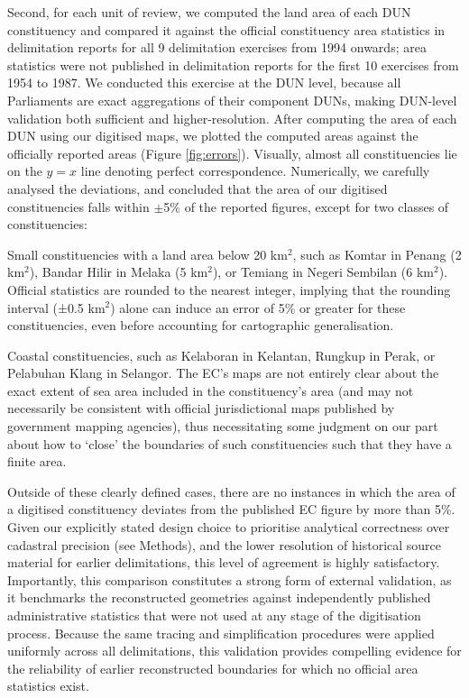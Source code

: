 \documentclass[11pt]{article}
\begin{document}
Second, for each unit of review, we computed the land area of each DUN constituency and compared it against the official constituency area statistics in delimitation reports for all 9 delimitation exercises from 1994 onwards; area statistics were not published in delimitation reports for the first 10 exercises from 1954 to 1987. We conducted this exercise at the DUN level, because all Parliaments are exact aggregations of their component DUNs, making DUN-level validation both sufficient and higher-resolution. After computing the area of each DUN using our digitised maps, we plotted the computed areas against the officially reported areas (Figure \ref{fig:errors}). Visually, almost all constituencies lie on the $y=x$ line denoting perfect correspondence. Numerically, we carefully analysed the deviations, and concluded that the area of our digitised constituencies falls within $\pm$5\% of the reported figures, except for two classes of constituencies:
\begin{enumbul}
	\item Small constituencies with a land area below 20 km$^2$, such as Komtar in Penang (2 km$^2$), Bandar Hilir in Melaka (5 km$^2$), or Temiang in Negeri Sembilan (6 km$^2$). Official statistics are rounded to the nearest integer, implying that the rounding interval (±0.5 km$^2$) alone can induce an error of 5\% or greater for these constituencies, even before accounting for cartographic generalisation.
	\item Coastal constituencies, such as Kelaboran in Kelantan, Rungkup in Perak, or Pelabuhan Klang in Selangor. The EC's maps are not entirely clear about the exact extent of sea area included in the constituency's area (and may not necessarily be consistent with official jurisdictional maps published by government mapping agencies), thus necessitating some judgment on our part about how to `close' the boundaries of such constituencies such that they have a finite area.
\end{enumbul}
Outside of these clearly defined cases, there are no instances in which the area of a digitised constituency deviates from the published EC figure by more than 5\%. Given our explicitly stated design choice to prioritise analytical correctness over cadastral precision (see Methods), and the lower resolution of historical source material for earlier delimitations, this level of agreement is highly satisfactory. Importantly, this comparison constitutes a strong form of external validation, as it benchmarks the reconstructed geometries against independently published administrative statistics that were not used at any stage of the digitisation process. Because the same tracing and simplification procedures were applied uniformly across all delimitations, this validation provides compelling evidence for the reliability of earlier reconstructed boundaries for which no official area statistics exist.
\end{document}
